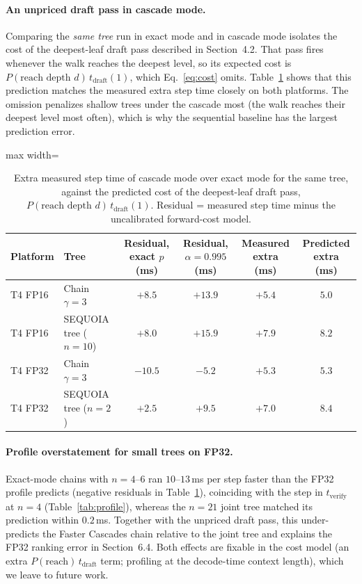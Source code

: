 \documentclass[10pt]{article}
\begin{document}
\paragraph{An unpriced draft pass in cascade mode.} Comparing the \emph{same tree} run in exact mode and in cascade mode isolates the cost of the deepest-leaf draft pass described in Section~4.2. That pass fires whenever the walk reaches the deepest level, so its expected cost is $P(\text{reach depth } d)\, t_{\mathrm{draft}}(1)$, which Eq.~\eqref{eq:cost} omits. Table~\ref{tab:deepleaf} shows that this prediction matches the measured extra step time closely on both platforms. The omission penalizes shallow trees under the cascade most (the walk reaches their deepest level most often), which is why the sequential baseline has the largest prediction error.

\begin{table}[h]
  \caption{Extra measured step time of cascade mode over exact mode for the same tree, against the predicted cost of the deepest-leaf draft pass, $P(\text{reach depth } d)\, t_{\mathrm{draft}}(1)$. Residual = measured step time minus the uncalibrated forward-cost model.}
  \label{tab:deepleaf}
  \centering
  \begin{adjustbox}{max width=\linewidth}
  \begin{tabular}{llcccc}
    \toprule
    Platform & Tree & Residual, exact $p$ (ms) & Residual, $\alpha = 0.995$ (ms) & Measured extra (ms) & Predicted extra (ms) \\
    \midrule
    T4 FP16 & Chain $\gamma = 3$ & $+8.5$ & $+13.9$ & $+5.4$ & $5.0$ \\
    T4 FP16 & SEQUOIA tree ($n=10$) & $+8.0$ & $+15.9$ & $+7.9$ & $8.2$ \\
    T4 FP32 & Chain $\gamma = 3$ & $-10.5$ & $-5.2$ & $+5.3$ & $5.3$ \\
    T4 FP32 & SEQUOIA tree ($n=2$) & $+2.5$ & $+9.5$ & $+7.0$ & $8.4$ \\
    \bottomrule
  \end{tabular}
  \end{adjustbox}
  \vspace{11pt}
\end{table}

\paragraph{Profile overstatement for small trees on FP32.} Exact-mode chains with $n = 4$--$6$ ran $10$--$13$\,ms per step faster than the FP32 profile predicts (negative residuals in Table~\ref{tab:deepleaf}), coinciding with the step in $t_{\mathrm{verify}}$ at $n = 4$ (Table~\ref{tab:profile}), whereas the $n = 21$ joint tree matched its prediction within $0.2$\,ms. Together with the unpriced draft pass, this under-predicts the Faster Cascades chain relative to the joint tree and explains the FP32 ranking error in Section~6.4. Both effects are fixable in the cost model (an extra $P(\text{reach})\, t_{\mathrm{draft}}$ term; profiling at the decode-time context length), which we leave to future work.
\end{document}
